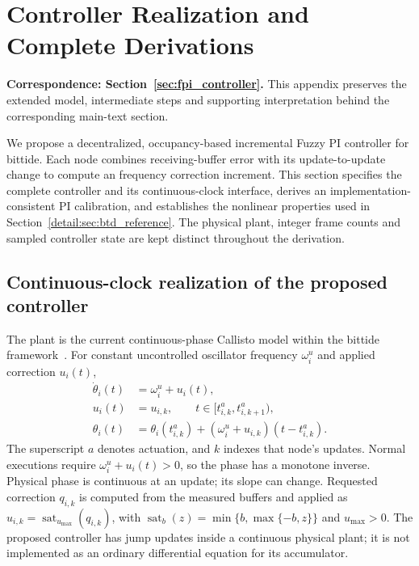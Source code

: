\section{Controller Realization and Complete Derivations}
\label{app:controller}
\noindent\textbf{Correspondence: Section~\ref{sec:fpi_controller}.} This appendix preserves the extended model, intermediate steps and supporting interpretation behind the corresponding main-text section.


\label{detail:sec:fpi_controller}
We propose a decentralized, occupancy-based incremental Fuzzy PI controller
for bittide. Each node combines receiving-buffer error with its
update-to-update change to compute an frequency correction increment.
This section specifies the complete controller and its continuous-clock
interface, derives an implementation-consistent PI calibration, and
establishes the nonlinear properties used in
Section~\ref{detail:sec:btd_reference}. The physical plant, integer frame counts
and sampled controller state are kept distinct throughout the derivation.

\subsection{Continuous-clock realization of the proposed controller}

\label{detail:subsec:fpi_laws}
The plant is the current continuous-phase Callisto model within the bittide
framework~\cite{lall2024logicalSynchrony}. For constant
uncontrolled oscillator frequency $\omega_i^u$ and applied correction $u_i(t)$,
\begin{align}
 \dot\theta_i(t)&=\omega_i^u+u_i(t),\nonumber\\
 u_i(t)&=u_{i,k},\qquad t\in[t^a_{i,k},t^a_{i,k+1}),\nonumber\\
 \theta_i(t)&=\theta_i(t^a_{i,k})+
       (\omega_i^u+u_{i,k})(t-t^a_{i,k}).
 \label{detail:eq:fpi_continuous_plant}
\end{align}
The superscript $a$ denotes actuation, and $k$ indexes that node's updates.
Normal executions require $\omega_i^u+u_i(t)>0$, so the phase has a
monotone inverse. Physical phase is continuous at an update; its slope can change. Requested
correction $q_{i,k}$ is computed from the measured buffers and applied as
$u_{i,k}=\operatorname{sat}_{u_{\max}}(q_{i,k})$, with
$\operatorname{sat}_b(z)=\min\{b,\max\{-b,z\}\}$ and $u_{\max}>0$.
The proposed controller has jump updates inside a continuous physical plant;
it is not implemented as an ordinary differential equation for its accumulator.

